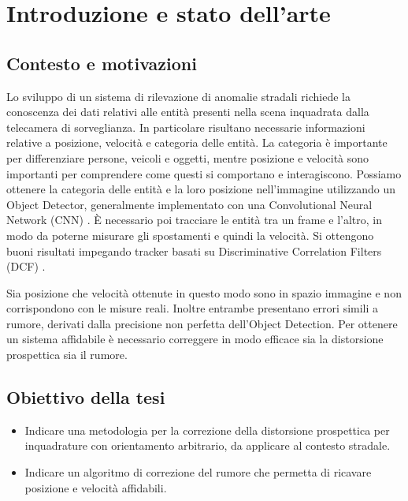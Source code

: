 \chapter{Introduzione e stato dell'arte}
\label{sec:introduzione}


\section{Contesto e motivazioni}

Lo sviluppo di un sistema di rilevazione di anomalie stradali richiede la conoscenza dei dati relativi alle entità presenti nella scena inquadrata dalla telecamera di sorveglianza.
In particolare risultano necessarie informazioni relative a posizione, velocità e categoria delle entità.
La categoria è importante per differenziare persone, veicoli e oggetti, mentre posizione e velocità sono importanti per comprendere come questi si comportano e interagiscono.
Possiamo ottenere la categoria delle entità e la loro posizione nell'immagine utilizzando un Object Detector, generalmente implementato con una Convolutional Neural Network (CNN) \cite{cnn}.
È necessario poi tracciare le entità tra un frame e l'altro, in modo da poterne misurare gli spostamenti e quindi la velocità.
Si ottengono buoni risultati impegando tracker basati su Discriminative Correlation Filters (DCF) \cite{dcf}.

Sia posizione che velocità ottenute in questo modo sono in spazio immagine e non corrispondono con le misure reali.
Inoltre entrambe presentano errori simili a rumore, derivati dalla precisione non perfetta dell'Object Detection.
Per ottenere un sistema affidabile è necessario correggere in modo efficace sia la distorsione prospettica sia il rumore.

\section{Obiettivo della tesi}
\begin{itemize}
	\item Indicare una metodologia per la correzione della distorsione prospettica per inquadrature con orientamento arbitrario, da applicare al contesto stradale.
	\item Indicare un algoritmo di correzione del rumore che permetta di ricavare posizione e velocità affidabili.
\end{itemize}

